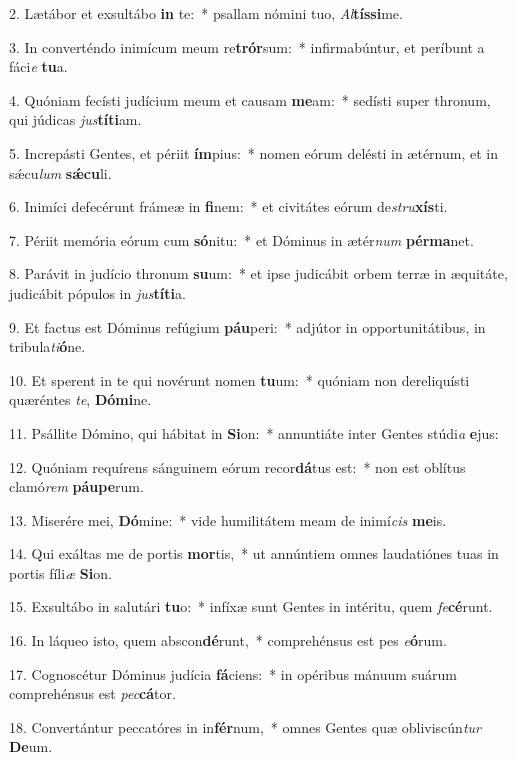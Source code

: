 2. Lætábor et exsultábo \textbf{in} te:~*  psallam nómini tuo, \textit{Al}\textbf{tís}\textbf{si}me.\

3. In converténdo inimícum meum re\textbf{trór}sum:~*  infirmabúntur, et períbunt a fáci\textit{e} \textbf{tu}a.\

4. Quóniam fecísti judícium meum et causam \textbf{me}am:~*  sedísti super thronum, qui júdicas \textit{jus}\textbf{tí}\textbf{ti}am.\

5. Increpásti Gentes, et périit \textbf{ím}pius:~*  nomen eórum delésti in ætérnum, et in sǽcu\textit{lum} \textbf{sǽ}\textbf{cu}li.\

6. Inimíci defecérunt frámeæ in \textbf{fi}nem:~*  et civitátes eórum de\textit{stru}\textbf{xís}ti.\

7. Périit memória eórum cum \textbf{só}nitu:~*  et Dóminus in ætér\textit{num} \textbf{pér}\textbf{ma}net.\

8. Parávit in judício thronum \textbf{su}um:~*  et ipse judicábit orbem terræ in æquitáte, judicábit pópulos in \textit{jus}\textbf{tí}\textbf{ti}a.\

9. Et factus est Dóminus refúgium \textbf{páu}peri:~*  adjútor in opportunitátibus, in tribula\textit{ti}\textbf{ó}ne.\

10. Et sperent in te qui novérunt nomen \textbf{tu}um:~*  quóniam non dereliquísti quæréntes \textit{te}, \textbf{Dó}\textbf{mi}ne.\

11. Psállite Dómino, qui hábitat in \textbf{Si}on:~*  annuntiáte inter Gentes stúdi\textit{a} \textbf{e}jus:\

12. Quóniam requírens sánguinem eórum recor\textbf{dá}tus est:~*  non est oblítus clamó\textit{rem} \textbf{páu}\textbf{pe}rum.\

13. Miserére mei, \textbf{Dó}mine:~*  vide humilitátem meam de inimí\textit{cis} \textbf{me}is.\

14. Qui exáltas me de portis \textbf{mor}tis,~*  ut annúntiem omnes laudatiónes tuas in portis fíli\textit{æ} \textbf{Si}on.\

15. Exsultábo in salutári \textbf{tu}o:~*  infíxæ sunt Gentes in intéritu, quem \textit{fe}\textbf{cé}runt.\

16. In láqueo isto, quem abscon\textbf{dé}runt,~*  comprehénsus est pes \textit{e}\textbf{ó}rum.\

17. Cognoscétur Dóminus judícia \textbf{fá}ciens:~*  in opéribus mánuum suárum comprehénsus est \textit{pec}\textbf{cá}tor.\

18. Convertántur peccatóres in in\textbf{fér}num,~*  omnes Gentes quæ obliviscún\textit{tur} \textbf{De}um.\

